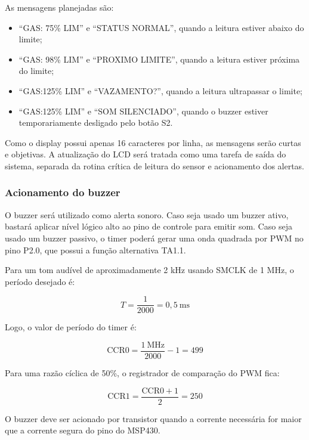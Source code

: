 \documentclass[11pt,a4paper]{article}
\numberwithin{equation}{section}
\begin{document}
As mensagens planejadas são:

\begin{itemize}
  \item ``GAS: 75\% LIM'' e ``STATUS NORMAL'', quando a leitura estiver abaixo do limite;
  \item ``GAS: 98\% LIM'' e ``PROXIMO LIMITE'', quando a leitura estiver próxima do limite;
  \item ``GAS:125\% LIM'' e ``VAZAMENTO?'', quando a leitura ultrapassar o limite;
  \item ``GAS:125\% LIM'' e ``SOM SILENCIADO'', quando o buzzer estiver temporariamente desligado pelo
        botão S2.
\end{itemize}

Como o display possui apenas 16 caracteres por linha, as mensagens serão curtas e objetivas. A
atualização do LCD será tratada como uma tarefa de saída do sistema, separada da rotina crítica de
leitura do sensor e acionamento dos alertas.

\subsubsection{Acionamento do buzzer}

O buzzer será utilizado como alerta sonoro. Caso seja usado um buzzer ativo, bastará aplicar nível
lógico alto ao pino de controle para emitir som. Caso seja usado um buzzer passivo, o timer poderá
gerar uma onda quadrada por PWM no pino P2.0, que possui a função alternativa TA1.1.

Para um tom audível de aproximadamente 2 kHz usando SMCLK de 1 MHz, o período desejado é:

\begin{equation}
  T = \frac{1}{2000} = 0{,}5\ \text{ms}
  \label{eq:periodo}
\end{equation}

Logo, o valor de período do timer é:

\begin{equation}
  \text{CCR0} = \frac{1\ \text{MHz}}{2000} - 1 = 499
  \label{eq:ccr0buzzer}
\end{equation}

Para uma razão cíclica de 50\%, o registrador de comparação do PWM fica:

\begin{equation}
  \text{CCR1} = \frac{\text{CCR0} + 1}{2} = 250
  \label{eq:ccr1}
\end{equation}

O buzzer deve ser acionado por transistor quando a corrente necessária for maior que a corrente
segura do pino do MSP430.
\end{document}
